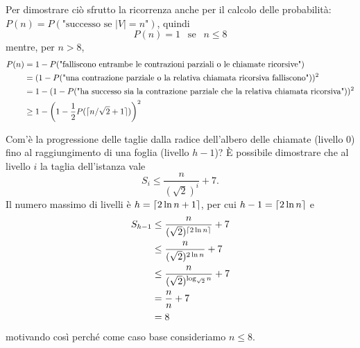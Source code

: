 Per dimostrare ciò sfrutto la ricorrenza anche per il calcolo delle probabilità: $P(n)=P(\text{"successo se }|V|=n\text{"})$, quindi
\[
P(n)=1\ \ \text{ se }\ \ n\leq 8
\]
mentre, per $n>8$,
\begin{align*}
P(n)&=1-P(\text{"falliscono entrambe le contrazioni parziali o le chiamate ricorsive"}) \\
&=(1-P(\text{"una contrazione parziale o la relativa chiamata ricorsiva falliscono"}))^2 \\
&=1-(1-P(\text{"ha successo sia la contrazione parziale che la relativa chiamata ricorsiva"}))^2 \\
&\geq 1-\left(1-\frac{1}{2}P(\lceil n/\sqrt{2}+1\rceil)\right)^2
\end{align*}

Com'è la progressione delle taglie dalla radice dell'albero delle chiamate (livello $0$) fino al raggiungimento di una foglia (livello $h-1$)? È possibile dimostrare che al livello $i$ la taglia dell'istanza vale
\[
S_i\leq\frac{n}{(\sqrt{2})^i}+7.
\]
Il numero massimo di livelli è $h=\lceil2\ln n+1\rceil$, per cui $h-1=\lceil2\ln n\rceil$ e
\begin{align*}
S_{h-1}&\leq \frac{n}{(\sqrt{2})^{\lceil2\ln n\rceil}}+7 \\
&\leq \frac{n}{(\sqrt{2})^{2\ln n}}+7 \\
&\leq \frac{n}{(\sqrt{2})^{\log_{\sqrt{2}} n}}+7 \\
&=\frac{n}{n}+7 \\
&=8
\end{align*}
motivando così perché come caso base consideriamo $n\leq 8$.


